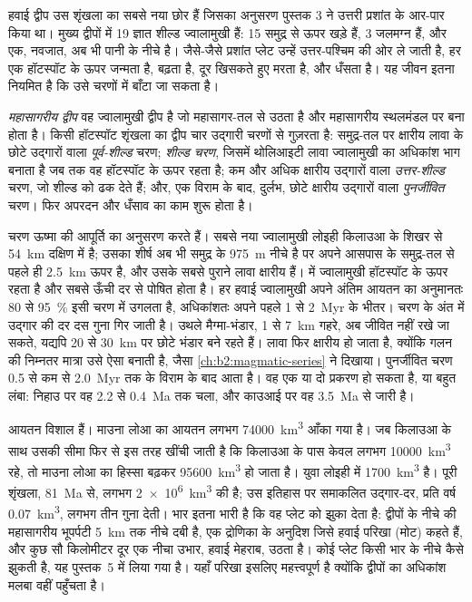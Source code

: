 हवाई द्वीप उस शृंखला का सबसे नया छोर हैं जिसका अनुसरण पुस्तक 3 ने उत्तरी प्रशांत के
आर-पार किया था। मुख्य द्वीपों में 19 ज्ञात शील्ड ज्वालामुखी हैं: 15 समुद्र से ऊपर खड़े हैं,
3 जलमग्न हैं, और एक, नवजात, अब भी पानी के नीचे है। जैसे-जैसे प्रशांत प्लेट उन्हें
उत्तर-पश्चिम की ओर ले जाती है, हर एक हॉटस्पॉट के ऊपर जन्मता है, बढ़ता है, दूर खिसकते हुए मरता है, और धँसता है। यह जीवन
इतना नियमित है कि उसे चरणों में बाँटा जा सकता है।

\begin{definition}[महासागरीय द्वीप; विकास के चरण]\label{def:b2:oceanic-islands:stages}
\emph{महासागरीय द्वीप} वह ज्वालामुखी द्वीप है जो महासागर-तल से
उठता है और महासागरीय स्थलमंडल पर बना होता है। किसी हॉटस्पॉट शृंखला का द्वीप चार उद्गारी
चरणों से गुज़रता है: समुद्र-तल पर क्षारीय लावा के छोटे उद्गारों वाला \emph{पूर्व-शील्ड} चरण;
\emph{शील्ड चरण}, जिसमें थोलिआइटी लावा ज्वालामुखी का अधिकांश भाग बनाता है
जब तक वह हॉटस्पॉट के ऊपर रहता है; कम और अधिक क्षारीय उद्गारों वाला \emph{उत्तर-शील्ड} चरण,
जो शील्ड को ढक देते हैं; और, एक विराम के बाद, दुर्लभ, छोटे क्षारीय उद्गारों वाला \emph{पुनर्जीवित}
चरण। फिर अपरदन और धँसाव का काम शुरू होता है।
\end{definition}

चरण ऊष्मा की आपूर्ति का अनुसरण करते हैं। सबसे नया ज्वालामुखी लोइही किलाउआ के शिखर से \qty{54}{km}
दक्षिण में है; उसका शीर्ष अब भी समुद्र के \qty{975}{m} नीचे है पर अपने आसपास के समुद्र-तल से पहले ही \qty{2.5}{km}
ऊपर है, और उसके सबसे पुराने लावा क्षारीय हैं।  में ज्वालामुखी
हॉटस्पॉट के ऊपर रहता है और सबसे ऊँची दर से पोषित होता है। हर हवाई ज्वालामुखी अपने अंतिम आयतन का अनुमानतः 80 से
\qty{95}{\percent} इसी चरण में उगलता है, अधिकांशतः अपने पहले 1 से \qty{2}{Myr} के भीतर।
चरण के अंत में उद्गार की दर दस गुना गिर जाती है। उथले मैग्मा-भंडार, 1
से \qty{7}{km} गहरे, अब जीवित नहीं रखे जा सकते, यद्यपि 20 से \qty{30}{km} पर छोटे भंडार
बने रहते हैं। लावा फिर क्षारीय हो जाता है, क्योंकि गलन की निम्नतर मात्रा उसे ऐसा बनाती है, जैसा
\cref{ch:b2:magmatic-series} ने दिखाया। पुनर्जीवित चरण 0.5 से कम
से \qty{2.0}{Myr} तक के विराम के बाद आता है। वह एक या दो प्रकरण हो सकता है, या बहुत लंबा: निहाउ पर वह 2.2 से
\qty{0.4}{Ma} तक चला, और काउआई पर वह \qty{3.5}{Ma} से जारी है।

आयतन विशाल हैं। माउना लोआ का आयतन लगभग \qty{74000}{km^3} आँका गया है। जब किलाउआ के साथ उसकी सीमा फिर से इस तरह खींची जाती है कि किलाउआ के पास केवल लगभग
\qty{10000}{km^3} रहे, तो माउना लोआ का हिस्सा बढ़कर \qty{95600}{km^3} हो जाता है। युवा लोइही में
\qty{1700}{km^3} है। पूरी शृंखला, \qty{81}{Ma} से, लगभग
\qty{2e6}{km^3} की है; उस इतिहास पर समाकलित उद्गार-दर, प्रति वर्ष \qty{0.07}{km^3}, लगभग तीन गुना देती। भार इतना भारी है कि वह
प्लेट को झुका देता है: द्वीपों के नीचे की महासागरीय भूपर्पटी \qty{5}{km} तक नीचे दबी है, एक
द्रोणिका के अनुदिश जिसे हवाई परिखा (मोट) कहते हैं, और कुछ सौ किलोमीटर दूर एक नीचा उभार, हवाई मेहराब,
उठता है। कोई प्लेट किसी भार के नीचे कैसे झुकती है, यह पुस्तक~5 में लिया गया है। यहाँ परिखा
इसलिए महत्त्वपूर्ण है क्योंकि द्वीपों का अधिकांश मलबा वहीं पहुँचता है।

